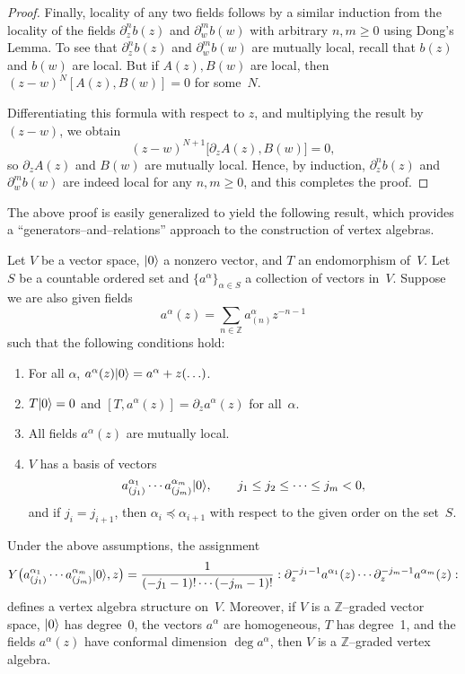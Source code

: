 \documentclass[12pt]{article}
\begin{document}
\begin{proof}
Finally, locality of any two fields follows by a similar induction from the locality
of the fields $\partial_z^n b(z)$ and $\partial_w^m b(w)$ with arbitrary $n,m\ge0$
using Dong’s Lemma.
To see that $\partial_z^n b(z)$ and $\partial_w^m b(w)$ are mutually local,
recall that $b(z)$ and $b(w)$ are local.
But if $A(z),B(w)$ are local, then $(z-w)^N [A(z),B(w)]=0$ for some~$N$.

Differentiating this formula with respect to $z$, and multiplying the result by $(z-w)$,
we obtain
\[
(z-w)^{N+1}\big[\partial_z A(z),B(w)\big]=0,
\]
so $\partial_z A(z)$ and $B(w)$ are mutually local.
Hence, by induction, $\partial_z^n b(z)$ and $\partial_w^m b(w)$
are indeed local for any $n,m\ge0$, and this completes the proof.
\end{proof}

The above proof is easily generalized to yield the following result,
which provides a ``generators–and–relations'' approach to the construction of vertex algebras.

Let $V$ be a vector space, $\lvert 0 \rangle$ a nonzero vector, and $T$ an endomorphism of~$V$.
Let $S$ be a countable ordered set and $\{a^\alpha\}_{\alpha\in S}$ a collection of vectors in~$V$.
Suppose we are also given fields
\[
a^\alpha(z) = \sum_{n\in\mathbb{Z}} a^\alpha_{(n)} z^{-n-1}
\]
such that the following conditions hold:
\begin{enumerate}
\item For all $\alpha$, $a^\alpha(z)\lvert 0 \rangle = a^\alpha + z(\ldots)$.
\item $T\lvert 0 \rangle=0$ and $[T,a^\alpha(z)] = \partial_z a^\alpha(z)$ for all~$\alpha$.
\item All fields $a^\alpha(z)$ are mutually local.
\item $V$ has a basis of vectors
\[
a^{\alpha_1}_{(j_1)} \cdots a^{\alpha_m}_{(j_m)} \lvert 0 \rangle,
\qquad
j_1\le j_2 \le \cdots \le j_m < 0,
\]
and if $j_i=j_{i+1}$, then $\alpha_i \preceq \alpha_{i+1}$
with respect to the given order on the set~$S$.
\end{enumerate}

\begin{theorem}
Under the above assumptions, the assignment
\begin{equation}\label{2.3.8}
Y\big(a^{\alpha_1}_{(j_1)}\cdots a^{\alpha_m}_{(j_m)}\lvert 0 \rangle,z\big)
=\frac{1}{(-j_1-1)!\cdots(-j_m-1)!}
:\partial_z^{-j_1-1} a^{\alpha_1}(z)\cdots \partial_z^{-j_m-1} a^{\alpha_m}(z):
\end{equation}
defines a vertex algebra structure on~$V$.
Moreover, if $V$ is a $\mathbb{Z}$–graded vector space,
$\lvert 0 \rangle$ has degree~0, the vectors $a^\alpha$ are homogeneous,
$T$ has degree~1, and the fields $a^\alpha(z)$ have conformal dimension
$\deg a^\alpha$, then $V$ is a $\mathbb{Z}$–graded vertex algebra.
\end{theorem}
\end{document}
